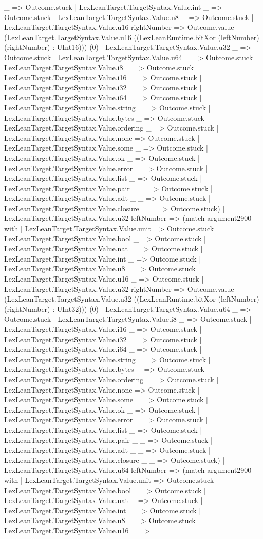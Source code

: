 \documentclass[11pt]{article}
\begin{document}
\_ => Outcome.stuck | LexLeanTarget.TargetSyntax.Value.int \_ => Outcome.stuck | LexLeanTarget.TargetSyntax.Value.u8 \_ => Outcome.stuck | LexLeanTarget.TargetSyntax.Value.u16 rightNumber => Outcome.value (LexLeanTarget.TargetSyntax.Value.u16 ((LexLeanRuntime.bitXor (leftNumber) (rightNumber) : UInt16))) (0) | LexLeanTarget.TargetSyntax.Value.u32 \_ => Outcome.stuck | LexLeanTarget.TargetSyntax.Value.u64 \_ => Outcome.stuck | LexLeanTarget.TargetSyntax.Value.i8 \_ => Outcome.stuck | LexLeanTarget.TargetSyntax.Value.i16 \_ => Outcome.stuck | LexLeanTarget.TargetSyntax.Value.i32 \_ => Outcome.stuck | LexLeanTarget.TargetSyntax.Value.i64 \_ => Outcome.stuck | LexLeanTarget.TargetSyntax.Value.string \_ => Outcome.stuck | LexLeanTarget.TargetSyntax.Value.bytes \_ => Outcome.stuck | LexLeanTarget.TargetSyntax.Value.ordering \_ => Outcome.stuck | LexLeanTarget.TargetSyntax.Value.none => Outcome.stuck | LexLeanTarget.TargetSyntax.Value.some \_ => Outcome.stuck | LexLeanTarget.TargetSyntax.Value.ok \_ => Outcome.stuck | LexLeanTarget.TargetSyntax.Value.error \_ => Outcome.stuck | LexLeanTarget.TargetSyntax.Value.list \_ => Outcome.stuck | LexLeanTarget.TargetSyntax.Value.pair \_ \_ => Outcome.stuck | LexLeanTarget.TargetSyntax.Value.adt \_ \_ => Outcome.stuck | LexLeanTarget.TargetSyntax.Value.closure \_ \_ => Outcome.stuck) | LexLeanTarget.TargetSyntax.Value.u32 leftNumber => (match argument2900 with | LexLeanTarget.TargetSyntax.Value.unit => Outcome.stuck | LexLeanTarget.TargetSyntax.Value.bool \_ => Outcome.stuck | LexLeanTarget.TargetSyntax.Value.nat \_ => Outcome.stuck | LexLeanTarget.TargetSyntax.Value.int \_ => Outcome.stuck | LexLeanTarget.TargetSyntax.Value.u8 \_ => Outcome.stuck | LexLeanTarget.TargetSyntax.Value.u16 \_ => Outcome.stuck | LexLeanTarget.TargetSyntax.Value.u32 rightNumber => Outcome.value (LexLeanTarget.TargetSyntax.Value.u32 ((LexLeanRuntime.bitXor (leftNumber) (rightNumber) : UInt32))) (0) | LexLeanTarget.TargetSyntax.Value.u64 \_ => Outcome.stuck | LexLeanTarget.TargetSyntax.Value.i8 \_ => Outcome.stuck | LexLeanTarget.TargetSyntax.Value.i16 \_ => Outcome.stuck | LexLeanTarget.TargetSyntax.Value.i32 \_ => Outcome.stuck | LexLeanTarget.TargetSyntax.Value.i64 \_ => Outcome.stuck | LexLeanTarget.TargetSyntax.Value.string \_ => Outcome.stuck | LexLeanTarget.TargetSyntax.Value.bytes \_ => Outcome.stuck | LexLeanTarget.TargetSyntax.Value.ordering \_ => Outcome.stuck | LexLeanTarget.TargetSyntax.Value.none => Outcome.stuck | LexLeanTarget.TargetSyntax.Value.some \_ => Outcome.stuck | LexLeanTarget.TargetSyntax.Value.ok \_ => Outcome.stuck | LexLeanTarget.TargetSyntax.Value.error \_ => Outcome.stuck | LexLeanTarget.TargetSyntax.Value.list \_ => Outcome.stuck | LexLeanTarget.TargetSyntax.Value.pair \_ \_ => Outcome.stuck | LexLeanTarget.TargetSyntax.Value.adt \_ \_ => Outcome.stuck | LexLeanTarget.TargetSyntax.Value.closure \_ \_ => Outcome.stuck) | LexLeanTarget.TargetSyntax.Value.u64 leftNumber => (match argument2900 with | LexLeanTarget.TargetSyntax.Value.unit => Outcome.stuck | LexLeanTarget.TargetSyntax.Value.bool \_ => Outcome.stuck | LexLeanTarget.TargetSyntax.Value.nat \_ => Outcome.stuck | LexLeanTarget.TargetSyntax.Value.int \_ => Outcome.stuck | LexLeanTarget.TargetSyntax.Value.u8 \_ => Outcome.stuck | LexLeanTarget.TargetSyntax.Value.u16 \_ => 
\end{document}
